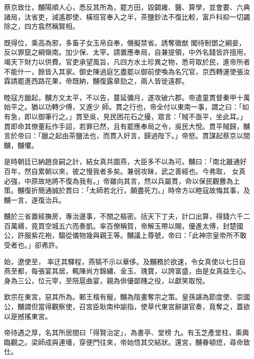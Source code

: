 \begin{pinyinscope}
 蔡京致仕，黼陽順人心，悉反其所為，罷方田，毀闢雍、醫、算學，並會要、六典諸局，汰省吏，減遙郡使、橫班官奉入之半，茶鹽鈔法不復比較，富戶科抑一切蠲除之，四方翕然稱賢相。



 既得位，乘高為邪，多畜子女玉帛自奉，僭擬禁省。誘奪徽猷
 閣待制鄧之綱妾，反以罪竄之綱嶺南。加少保、太宰。請置應奉局，自兼提領，中外名錢皆許擅用，竭天下財力以供費。官吏承望風旨，凡四方水土珍異之物，悉苛取於民，進帝所者不能什一，餘皆入其家。御史陳過庭乞盡罷以御前使喚為名冗官，京西轉運使張汝霖請罷進西路花果，帝既納，黼復露章劾之，兩人皆徙遠郡。



 睦寇方臘起，黼方文太平，不以告，蔓延彌月，遂攻破六郡。帝遣童貫督秦甲十萬始平之。猶以功轉少傅，又進少
 師。貫之行也，帝全付以東南一事，謂之曰：「如有急，即以御筆行之。」貫至吳，見民困花石之擾，眾言：「賊不亟平，坐此耳。」貫即命其僚董耘作手詔，若罪已然，且有罷應奉局之令，吳民大悅。貫平賊歸，黼言於帝曰：「臘之起由茶鹽法也，而貫入奸言，歸過陛下。」帝怒。貫謀起蔡京以間黼，黼懼。



 是時朝廷已納趙良嗣之計，結女真共圖燕，大臣多不以為可。黼曰：「南北雖通好百年，然自累朝以來，彼之慢我者多矣。兼弱攻昧，武之善經也。今弗取，
 女真必強，中原故地將不復為我有。」帝雖向其言，然以兵屬貫，命以保民觀釁為上策。黼復折簡通誠於貫曰：「太師若北行，願盡死力。」時帝方以睦寇故悔其事，及黼一言，遂復治兵。



 黼於三省置經撫房，專治邊事，不關之樞密。括天下丁夫，計口出算，得錢六千二百萬緡，竟買空城五六而奏凱。率百僚稱賀，帝解玉帶以賜，優進太傅，封楚國公，許服紫花袍，騶從儀物幾與親王等。黼議上尊號，帝曰：「此神宗皇帝所不敢受者也。」卻弗許。



 始，遼使至，
 率迂其驛程，燕犒不示以華侈。及黼務於欲速，令女真使以七日自燕至都，每張宴其居，輒陳尚方錦繡、金玉、瑰寶，以誇富盛，由是女真益生心。身為三公，位元宰，至陪扈曲宴，親為俳優鄙賤之役，以獻笑取悅。



 欽宗在東宮，惡其所為。鄆王楷有寵，黼為陰畫奪宗之策。皇孫諶為節度使、崇國公，黼謂但當得觀察使，召宮臣耿南仲諭指，使草代東宮辭諶官奏，竟奪之，蓋欲以是撼搖東宮。



 帝待遇之厚，名其所居閤曰「得賢治定」，為書亭、堂榜
 九。有玉芝產堂柱，乘輿臨觀之。梁師成與連墻，穿便門往來，帝始悟其交結狀。還宮，黼眷頓熄，尋命致仕。




\end{pinyinscope}
